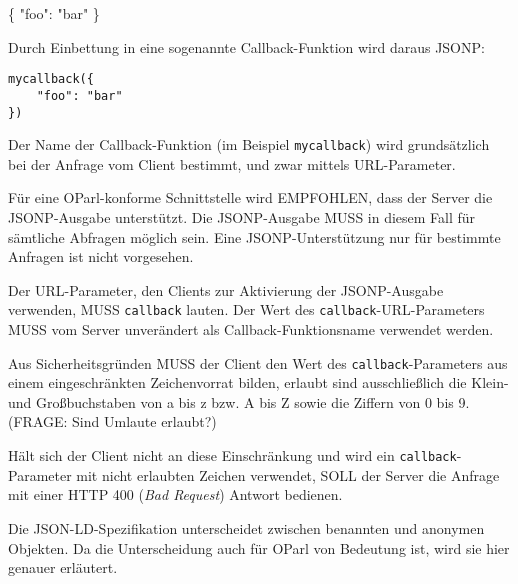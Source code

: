 \documentclass[,a4paper]{article}
\newenvironment{Shaded}{}{}
\newcommand{\DataTypeTok}[1]{\textcolor[rgb]{0.56,0.13,0.00}{{#1}}}
\newcommand{\StringTok}[1]{\textcolor[rgb]{0.25,0.44,0.63}{{#1}}}
\newcommand{\FunctionTok}[1]{\textcolor[rgb]{0.02,0.16,0.49}{{#1}}}
\begin{document}
\begin{Shaded}
\begin{Highlighting}[]
\FunctionTok{\{}
    \DataTypeTok{"foo"}\FunctionTok{:} \StringTok{"bar"}
\FunctionTok{\}}
\end{Highlighting}
\end{Shaded}

Durch Einbettung in eine sogenannte Callback-Funktion wird daraus JSONP:

\begin{verbatim}
mycallback({
    "foo": "bar"
})
\end{verbatim}

Der Name der Callback-Funktion (im Beispiel \texttt{mycallback}) wird
grundsätzlich bei der Anfrage vom Client bestimmt, und zwar mittels
URL-Parameter.

Für eine OParl-konforme Schnittstelle wird EMPFOHLEN, dass der Server
die JSONP-Ausgabe unterstützt. Die JSONP-Ausgabe MUSS in diesem Fall für
sämtliche Abfragen möglich sein. Eine JSONP-Unterstützung nur für
bestimmte Anfragen ist nicht vorgesehen.

Der URL-Parameter, den Clients zur Aktivierung der JSONP-Ausgabe
verwenden, MUSS \texttt{callback} lauten. Der Wert des
\texttt{callback}-URL-Parameters MUSS vom Server unverändert als
Callback-Funktionsname verwendet werden.

Aus Sicherheitsgründen MUSS der Client den Wert des
\texttt{callback}-Parameters aus einem eingeschränkten Zeichenvorrat
bilden, erlaubt sind ausschließlich die Klein- und Großbuchstaben von a
bis z bzw. A bis Z sowie die Ziffern von 0 bis 9. (FRAGE: Sind Umlaute
erlaubt?)

Hält sich der Client nicht an diese Einschränkung und wird ein
\texttt{callback}-Parameter mit nicht erlaubten Zeichen verwendet, SOLL
der Server die Anfrage mit einer HTTP 400 (\emph{Bad Request}) Antwort
bedienen.


Die JSON-LD-Spezifikation unterscheidet zwischen benannten und anonymen
Objekten. Da die Unterscheidung auch für OParl von Bedeutung ist, wird
sie hier genauer erläutert.
\end{document}
